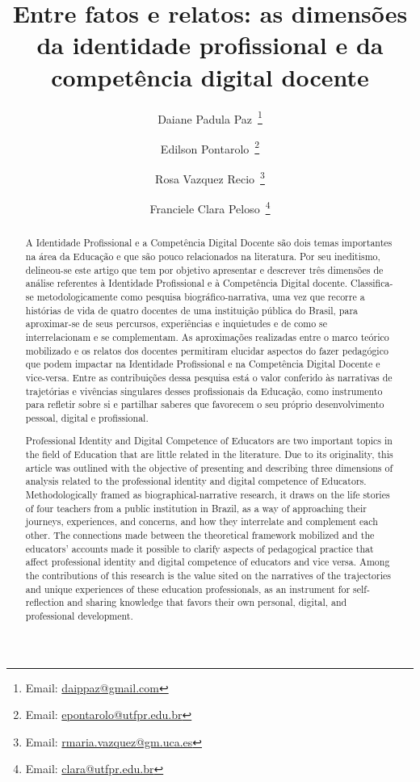 \documentclass[portuguese]{textolivre}
\title{Entre fatos e relatos: as dimensões da identidade profissional e da competência digital docente}
\author[1,2]{Daiane Padula Paz~\orcid{0000-0003-2658-9426}\thanks{Email: \href{mailto:daippaz@gmail.com}{daippaz@gmail.com}}}
\author[1]{Edilson Pontarolo~\orcid{0000-0002-6382-6403}\thanks{Email: \href{mailto:epontarolo@utfpr.edu.br}{epontarolo@utfpr.edu.br}}}
\author[3]{Rosa Vazquez Recio~\orcid{0000-0001-6595-177X}\thanks{Email: \href{mailto:rmaria.vazquez@gm.uca.es}{rmaria.vazquez@gm.uca.es}}}
\author[1]{Franciele Clara Peloso~\orcid{0000-0002-9647-001X}\thanks{Email: \href{mailto:clara@utfpr.edu.br}{clara@utfpr.edu.br}}}
\affil[1]{Universidade Tecnológica Federal do Paraná, campus Pato Branco, PR, Brasil.}
\affil[2]{Instituto Federal do Paraná, campus Palmas, PR, Brasil.}
\affil[3]{Universidade de Cádiz, campus Puerto Real, Espanha}
\begin{document}
\maketitle
\begin{polyabstract}
\begin{abstract}
A Identidade Profissional e a Competência Digital Docente são dois temas importantes na área da Educação e que são pouco relacionados na literatura. Por seu ineditismo, delineou-se este artigo que tem por objetivo apresentar e descrever três dimensões de análise referentes à Identidade Profissional e à Competência Digital docente. Classifica-se metodologicamente como pesquisa biográfico-narrativa, uma vez que recorre a histórias de vida de quatro docentes de uma instituição pública do Brasil, para aproximar-se de seus percursos, experiências e inquietudes e de como se interrelacionam e se complementam. As aproximações realizadas entre o marco teórico mobilizado e os relatos dos docentes permitiram elucidar aspectos do fazer pedagógico que podem impactar na Identidade Profissional e na Competência Digital Docente e vice-versa. Entre as contribuições dessa pesquisa está o valor conferido às narrativas de trajetórias e vivências singulares desses profissionais da Educação, como instrumento para refletir sobre si e partilhar saberes que favorecem o seu próprio desenvolvimento pessoal, digital e profissional.

\end{abstract}

\begin{english}
\begin{abstract}
Professional Identity and Digital Competence of Educators are two important topics in the field of Education that are little related in the literature. Due to its originality, this article was outlined with the objective of presenting and describing three dimensions of analysis related to the professional identity and digital competence of Educators. Methodologically framed as biographical-narrative research, it draws on the life stories of four teachers from a public institution in Brazil, as a way of approaching their journeys, experiences, and concerns, and how they interrelate and complement each other. The connections made between the theoretical framework mobilized and the educators’ accounts made it possible to clarify aspects of pedagogical practice that affect professional identity and digital competence of educators and vice versa. Among the contributions of this research is the value sited on the narratives of the trajectories and unique experiences of these education professionals, as an instrument for self-reflection and sharing knowledge that favors their own personal, digital, and professional development.

\end{abstract}
\end{english}
\end{polyabstract}
\end{document}
